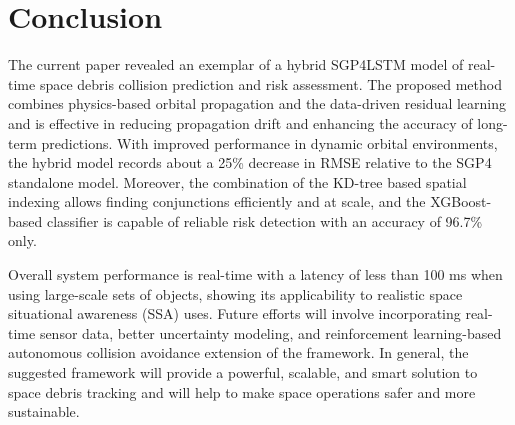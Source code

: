 \documentclass{ieeeaccess}
\begin{document}
\section{Conclusion}
The current paper revealed an exemplar of a hybrid SGP4LSTM model of real-time space debris collision prediction and risk assessment. The proposed method combines physics-based orbital propagation and the data-driven residual learning and is effective in reducing propagation drift and enhancing the accuracy of long-term predictions. With improved performance in dynamic orbital environments, the hybrid model records about a 25\% decrease in RMSE relative to the SGP4 standalone model. Moreover, the combination of the KD-tree based spatial indexing allows finding conjunctions efficiently and at scale, and the XGBoost-based classifier is capable of reliable risk detection with an accuracy of 96.7\% only.

Overall system performance is real-time with a latency of less than 100 ms when using large-scale sets of objects, showing its applicability to realistic space situational awareness (SSA) uses. Future efforts will involve incorporating real-time sensor data, better uncertainty modeling, and reinforcement learning-based autonomous collision avoidance extension of the framework. In general, the suggested framework will provide a powerful, scalable, and smart solution to space debris tracking and will help to make space operations safer and more sustainable.
\end{document}
